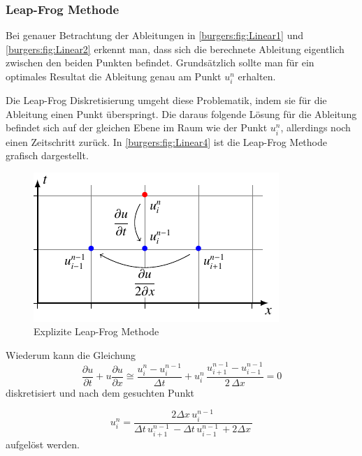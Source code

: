 \subsubsection{Leap-Frog Methode}
%
	Bei genauer Betrachtung der Ableitungen in \autoref{burgers:fig:Linear1} und \autoref{burgers:fig:Linear2} erkennt man, dass sich die berechnete Ableitung eigentlich zwischen den beiden Punkten befindet.
	Grunds\"atzlich sollte man für ein optimales Resultat die Ableitung genau am Punkt $u_{i}^{n}$ erhalten.

	\medskip
	Die Leap-Frog Diskretisierung umgeht diese Problematik, indem sie f\"ur die Ableitung einen Punkt \"uberspringt.
	Die daraus folgende L\"osung für die Ableitung befindet sich auf der gleichen Ebene im Raum wie der Punkt $u_{i}^{n}$, allerdings noch einen Zeitschritt zurück.
	In \autoref{burgers:fig:Linear4} ist die Leap-Frog Methode grafisch dargestellt.

	     \begin{figure}
		\centering
		\includegraphics[height=.4\textwidth]{papers/burgers/BurgersEquation/tikz/linear4/linear4.pdf}
		\caption{Explizite Leap-Frog Methode}
		\label{burgers:fig:Linear4}
		\end{figure}

	Wiederum kann die Gleichung
	\begin{equation}
	\frac {\partial u}{\partial t}+u{\frac {\partial u}{\partial x}} \cong \frac{u_{i}^{n}-u_{i}^{n-1}}{\Delta t}+ u_{i}^{n}\, \frac{u_{i+1}^{n-1}-u_{i-1}^{n-1}}{2\,\Delta x}=0
	\end{equation}
	diskretisiert und nach dem gesuchten Punkt


	\begin{equation}
	u_{i}^{n} = \frac{2 \Delta{x}\, u^{n-1}_{i}\,}{\Delta{t}\, u^{n-1}_{i+1}\, - \Delta{t}\, u^{n-1}_{i-1}\, + 2 \Delta{x}\,}
	\end{equation}
 aufgel\"ost werden.

\medskip

